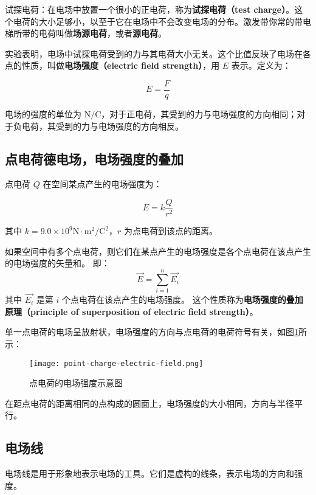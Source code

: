 \documentclass[lang=cn,newtx,10pt,scheme=chinese]{elegantbook}
\begin{document}
试探电荷：在电场中放置一个很小的正电荷，称为\textbf{试探电荷（test charge）}。这个电荷的大小足够小，以至于它在电场中不会改变电场的分布。激发带你常的带电梯所带的电荷叫做\textbf{场源电荷}，或者\textbf{源电荷}。

\begin{definition}
  实验表明，电场中试探电荷受到的力与其电荷大小无关。这个比值反映了电场在各点的性质，叫做\textbf{电场强度（electric field strength）}，用 $E$ 表示。定义为：

  $$
  E = \frac{F}{q}
  $$

  电场的强度的单位为 $\text{N}/\text{C}$，对于正电荷，其受到的力与电场强度的方向相同；对于负电荷，其受到的力与电场强度的方向相反。
\end{definition}

\subsection{点电荷德电场，电场强度的叠加}

\begin{theorem}
  点电荷 $Q$ 在空间某点产生的电场强度为：

  $$
  E = k\frac{Q}{r^2}
  $$

  其中 $k=9.0 \times 10^9 \text{N} \cdot \text{m}^2 / \text{C}^2$，$r$ 为点电荷到该点的距离。

  如果空间中有多个点电荷，则它们在某点产生的电场强度是各个点电荷在该点产生的电场强度的矢量和。
  即：
  $$
  \vec{E} = \sum_{i=1}^{n} \vec{E_i}
  $$
  其中 $\vec{E_i}$ 是第 $i$ 个点电荷在该点产生的电场强度。
  这个性质称为\textbf{电场强度的叠加原理（principle of superposition of electric field strength）}。
\end{theorem}

单一点电荷的电场呈放射状，电场强度的方向与点电荷的电荷符号有关，如图\ref{fig:point-charge-electric-field}所示：
\begin{figure}[htbp]
  \centering
  \texttt{[image: point-charge-electric-field.png]}
  \caption{点电荷的电场强度示意图}
  \label{fig:point-charge-electric-field}
\end{figure}

在距点电荷的距离相同的点构成的圆面上，电场强度的大小相同，方向与半径平行。

\subsection{电场线}

电场线是用于形象地表示电场的工具。它们是虚构的线条，表示电场的方向和强度。
\end{document}

